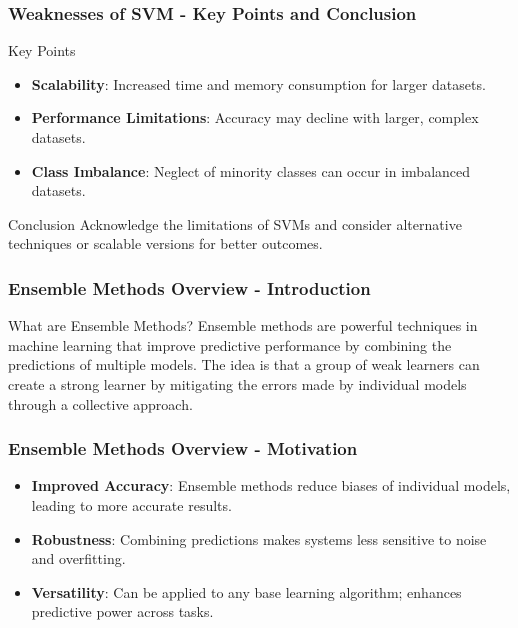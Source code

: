 \documentclass[aspectratio=169]{beamer}
\begin{document}
\begin{frame}[fragile]
    \frametitle{Weaknesses of SVM - Key Points and Conclusion}
    \begin{block}{Key Points}
        \begin{itemize}
            \item \textbf{Scalability}: Increased time and memory consumption for larger datasets.
            \item \textbf{Performance Limitations}: Accuracy may decline with larger, complex datasets.
            \item \textbf{Class Imbalance}: Neglect of minority classes can occur in imbalanced datasets.
        \end{itemize}
    \end{block}
    
    \begin{block}{Conclusion}
        Acknowledge the limitations of SVMs and consider alternative techniques or scalable versions for better outcomes.
    \end{block}
\end{frame}

\begin{frame}[fragile]
    \frametitle{Ensemble Methods Overview - Introduction}
    \begin{block}{What are Ensemble Methods?}
        Ensemble methods are powerful techniques in machine learning that improve predictive performance by combining the predictions of multiple models. The idea is that a group of weak learners can create a strong learner by mitigating the errors made by individual models through a collective approach.
    \end{block}
\end{frame}

\begin{frame}[fragile]
    \frametitle{Ensemble Methods Overview - Motivation}
    \begin{itemize}
        \item \textbf{Improved Accuracy}: Ensemble methods reduce biases of individual models, leading to more accurate results.
        \item \textbf{Robustness}: Combining predictions makes systems less sensitive to noise and overfitting.
        \item \textbf{Versatility}: Can be applied to any base learning algorithm; enhances predictive power across tasks.
    \end{itemize}
\end{frame}
\end{document}
